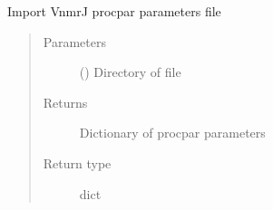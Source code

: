 \documentclass[letterpaper,10pt,english]{sphinxmanual}
\begin{document}
\begin{fulllineitems}
\label{\detokenize{dnpImport:dnpLab.dnpImport.vnmrj.import_procpar}}
Import VnmrJ procpar parameters file
\begin{quote}\begin{description}
\item[{Parameters}] \leavevmode
{} () \sphinxhyphen{}\sphinxhyphen{} Directory of file

\item[{Returns}] \leavevmode
Dictionary of procpar parameters

\item[{Return type}] \leavevmode
dict

\end{description}\end{quote}

\end{fulllineitems}

\end{document}
